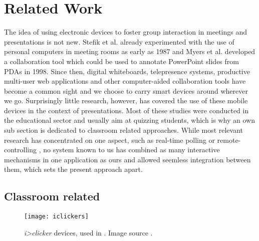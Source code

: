 \chapter{Related Work}
\label{cha:related-work}

The idea of using electronic devices to foster group interaction in meetings and presentations is not new. Stefik et al. \cite{Stefik:BeyondTheChalkboard} already experimented with the use of personal computers in meeting rooms as early as 1987 and Myers et al. \cite{Myers:CollaborationPDAs} developed a collaboration tool which could be used to annotate PowerPoint slides from PDAs in 1998. Since then, digital whiteboards, telepresence systems, productive multi-user web applications and other computer-aided collaboration tools have become a common sight and we choose to carry smart devices around wherever we go. Surprisingly little research, however, has covered the use of these mobile devices in the context of presentations. Most of these studies were conducted in the educational sector and usually aim at quizzing students, which is why an own sub section is dedicated to classroom related approaches. While most relevant research has concentrated on one aspect, such as real-time polling \cite{Inoue:RealTimeQuestionnaire} or remote-controlling \cite{Chattopadhyay:OfficeSocialRemoteControl}, no system known to us has combined as many interactive mechanisms in one application as ours and allowed seemless integration between them, which sets the present approach apart.

\section{Classroom related}
\label{sec:related-work-classroom}

\begin{figure}
\centering
\texttt{[image: iclickers]}
\caption{\emph{i>clicker} devices, used in \cite{Chamillard:StudentResponseSystem}. Image source \cite{iclicker}.}
\label{fig:related-work-iclicker}
\end{figure}


